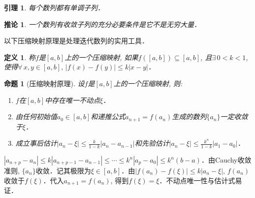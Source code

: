 \documentclass[11pt,a4paper]{ctexart}
\makeatletter
\theoremstyle{thmseries} %
\newtheorem{cor}{推论}[section]
\newtheorem{prop}{命题}[section]
\newtheorem{lem}{引理}[section]
\theoremstyle{exerseries}
\newtheorem{defn}{定义}[section]
\newtheorem{exer}{习题}[section]
\newtheorem*{rem}{注}
\renewenvironment{proof}[1][\proofname]{\par
  \pushQED{\qed}%
  \normalfont \topsep6\p@\@plus6\p@\relax
  \trivlist
  \item[\hskip\labelsep
        \itshape
    #1\@addpunct{}]\ignorespaces
}{%
  \popQED\endtrivlist\@endpefalse
}
\newenvironment{pf}{\begin{proof}[\bfseries\upshape 证\quad]}{\end{proof}}
\newcommand{\bra}[1]{\mathopen{}\left(#1\right)}
\makeatother
\begin{document}

\begin{lem}
	每个数列都有单调子列．
\end{lem}

\begin{cor}
	一个数列有收敛子列的充分必要条件是它不是无穷大量．
\end{cor}

以下压缩映射原理是处理迭代数列的实用工具．
\begin{defn}
	称$f$是$[a,b]$上的一个压缩映射, 如果$f\bra{[a,b]}\subseteq[a,b]$, 且$\exists\,0<k<1$, 使得$\forall\,x,y\in[a,b],\,|f(x)-f(y)|\leq k|x-y|$．
\end{defn}

\begin{prop}[压缩映射原理]
	设$f$是$[a,b]$上的一个压缩映射, 则:
	\begin{enumerate}
		\item $f$在$[a,b]$中存在唯一不动点$\xi$．
		\item 由任何初始值$a_0\in[a,b]$和递推公式$a_{n+1}=f(a_n)$生成的数列$\{a_n\}$一定收敛于$\xi$．
		\item 成立事后估计$|a_n-\xi|\leq\frac{k}{1-k}|a_n-a_{n-1}|$和先验估计$|a_n-\xi|\leq\frac{k^n}{1-k}|a_1-a_0|$．
	\end{enumerate}
\end{prop}
\begin{pf}
	$|a_{n+p}-a_n|\leq k|a_{n+p-1}-a_{n-1}|\leq\cdots\leq k^n|a_p-a_0|\leq k^n(b-a)$．由Cauchy收敛准则, $\{a_n\}$收敛．记其极限为$\xi\in[a,b]$．由$|f(a_n)-f(\xi)|\leq k|a_n-\xi|,\,f(a_n)$收敛于$f(\xi)$．代入$a_{n+1}=f(a_n)$, 得到$f(\xi)=\xi$．不动点唯一性与估计式易证．
\end{pf}

\end{document}
